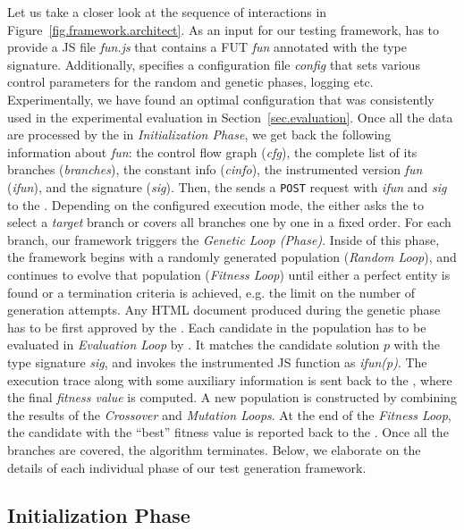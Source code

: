Let us take a closer look at the sequence of interactions in Figure~\ref{fig.framework.architect}. As an input for our testing framework, \User has to provide a JS file \emph{fun.js} that contains a FUT \emph{fun} annotated with the type signature. Additionally, \User specifies a configuration file \emph{config} that sets various control parameters for the random and genetic phases, logging etc. Experimentally, we have found an optimal configuration that was consistently used in the experimental evaluation in Section~\ref{sec.evaluation}. Once all the data are processed by the \Server in \emph{Initialization Phase}, we get back the following information about \emph{fun}: the control flow graph (\emph{cfg}), the complete list of its branches (\emph{branches}), the constant info (\emph{cinfo}), the instrumented version \emph{fun} (\emph{ifun}), and the signature (\emph{sig}). Then, the \Server sends a \texttt{POST} request with \emph{ifun} and \emph{sig} to the \Client. Depending on the configured execution mode, the \Server either asks the \User to select a \emph{target} branch or covers all branches one by one in a fixed order. For each branch, our framework triggers the \emph{Genetic Loop (Phase)}. Inside of this phase, the framework begins with a randomly generated population (\emph{Random Loop}), and continues to evolve that population (\emph{Fitness Loop}) until either a perfect entity is found or a termination criteria is achieved, e.g. the limit on the number of generation attempts. Any HTML document produced during the genetic phase has to be first approved by the \Validator. Each candidate in the population has to be evaluated in \emph{Evaluation Loop} by \Client. It matches the candidate solution $p$ with the type signature \emph{sig}, and invokes the instrumented JS function as \emph{ifun(p)}. The execution trace along with some auxiliary information is sent back to the \Server, where the final \emph{fitness value} is computed. A new population is constructed by combining the results of the \emph{Crossover} and \emph{Mutation Loops}. At the end of the \emph{Fitness Loop}, the candidate with the ``best'' fitness value is reported back to the \User. Once all the branches are covered, the algorithm terminates. Below, we elaborate on the details of each individual phase of our test generation framework.

\subsection{Initialization Phase}
\label{sub.sec.init.phase}


